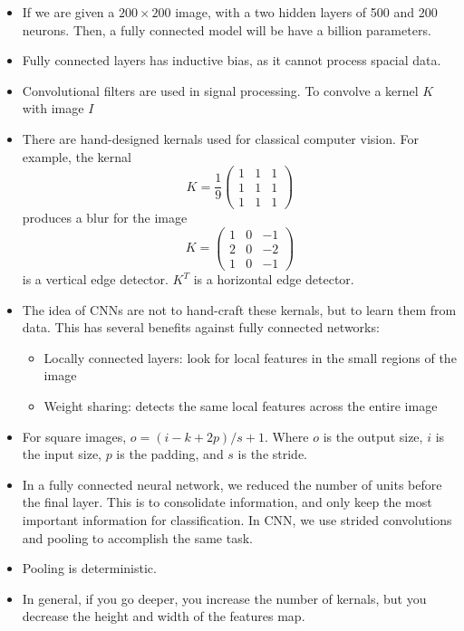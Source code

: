 \documentclass[a4paper]{article}
\numberwithin{equation}{section}
\begin{document}
\begin{itemize}
    \item If we are given a $200\times 200$ image, with a two hidden layers of 500 and 200 neurons. Then, a fully connected model will be have a billion parameters. 
    \item Fully connected layers has inductive bias, as it cannot process spacial data.
    \item Convolutional filters are used in signal processing. To convolve a kernel $K$ with image $I$
    \item There are hand-designed kernals used for classical computer vision. For example, the kernal
    \begin{equation}
        K=\frac{1}{9}\begin{pmatrix}
            1 & 1 & 1\\ 1 & 1 & 1\\
1 & 1 & 1\end{pmatrix}    
    \end{equation}
    produces a blur for the image
    \begin{equation}
        K=\begin{pmatrix}
            1 & 0 & -1\\ 2 & 0 & -2\\ 1 & 0 & -1  
        \end{pmatrix}
    \end{equation}
    is a vertical edge detector. $K^T$ is a horizontal edge detector.
    \item The idea of CNNs are not to hand-craft these kernals, but to learn them from data. This has several benefits against fully connected networks:
    \begin{itemize}
        \item Locally connected layers: look for local features in the small regions of the image
        \item Weight sharing: detects the same local features across the entire image
    \end{itemize}
    \item For square images, $o=(i-k+2p)/s+1$. Where $o$ is the output size, $i$ is the input size, $p$ is the padding, and $s$ is the stride.
    \item In a fully connected neural network, we reduced the number of units before the final layer. This is to consolidate information, and only keep the most important information for classification. In CNN, we use strided convolutions and pooling to accomplish the same task.
    \item Pooling is deterministic. 
    \item In general, if you go deeper, you increase the number of kernals, but you decrease the height and width of the features map.
\end{itemize}
\end{document}
